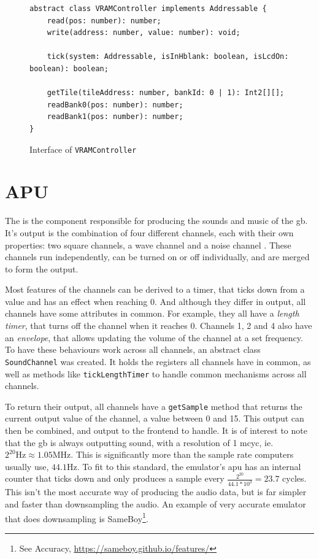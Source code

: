 \documentclass[11pt]{report}
\begin{document}
\begin{figure}[h]
    \begin{verbatim}
abstract class VRAMController implements Addressable {
    read(pos: number): number;
    write(address: number, value: number): void;

    tick(system: Addressable, isInHblank: boolean, isLcdOn: boolean): boolean;

    getTile(tileAddress: number, bankId: 0 | 1): Int2[][];
    readBank0(pos: number): number;
    readBank1(pos: number): number;
}
    \end{verbatim}
    \caption{Interface of \texttt{VRAMController}}
    \label{fig:vramcontroller-interface}
\end{figure}


\section{APU}

The  is the component responsible for producing the sounds and music of the \gls{gb}. It's output is the combination of four different channels, each with their own properties: two square channels, a wave channel and a noise channel \cite[Audio]{pandoc}. These channels run independently, can be turned on or off individually, and are merged to form the output.

 Most features of the channels can be derived to a timer, that ticks down from a value and has an effect when reaching 0. And although they differ in output, all channels have some attributes in common. For example, they all have a \textit{length timer}, that turns off the channel when it reaches 0. Channels 1, 2 and 4 also have an \textit{envelope}, that allows updating the volume of the channel at a set frequency. To have these behaviours work across all channels, an abstract class \texttt{SoundChannel} was created. It holds the registers all channels have in common, as well as methods like \texttt{tickLengthTimer} to handle common mechanisms across all channels.

To return their output, all channels have a \texttt{getSample} method that returns the current output value of the channel, a value between 0 and 15. This output can then be combined, and output to the frontend to handle. It is of interest to note that the \gls{gb} is always outputting sound, with a resolution of 1 \gls{mcyc}, ie. $2^{20}\text{Hz} \approx 1.05\text{MHz}$. This is significantly more than the sample rate computers usually use, $44.1\text{Hz}$. To fit to this standard, the emulator's \gls{apu} has an internal counter that ticks down and only produces a sample every $\frac{2^20}{44.1*10^3}=23.7$ cycles. This isn't the most accurate way of producing the audio data, but is far simpler and faster than downsampling the audio. An example of very accurate emulator that does downsampling is SameBoy\footnote{See Accuracy, \url{https://sameboy.github.io/features/}}.
\end{document}
